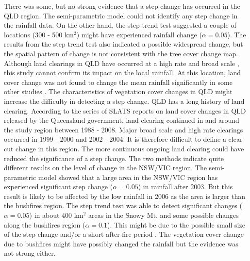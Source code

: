 \documentclass[draft,linenumbers]{agujournal}
\begin{document}
\begin{article}
There was some, but no strong evidence that a step change has occurred in the QLD region. The semi-parametric model could not identify any step change in the rainfall data. On the other hand, the step trend test suggested a couple of locations (300 - 500 km$^2$) might have experienced rainfall change ($\alpha = 0.05$). The results from the step trend test also indicated a possible widespread change, but the spatial pattern of change is not consistent with the tree cover change map. Although land clearings in QLD have occurred at a high rate and broad scale \citep{SLATS2005}, this study cannot confirm its impact on the local rainfall. At this location, land cover change was not found to change the mean rainfall significantly in some other studies \citep[e.g.][]{Narisma2003,McAlpine2007}. The characteristics of vegetation cover changes in QLD might increase the difficulty in detecting a step change. QLD has a long history of land clearing. According to the series of SLATS reports on land cover changes in QLD released by the Queensland government, land clearing continued in and around the study region between 1988 - 2008. Major broad scale and high rate clearings occurred in 1999 - 2000 and 2002 - 2004. It is therefore difficult to define a clear cut change in this region. The more continuous ongoing land clearing could have reduced the significance of a step change. %
The two methods indicate quite different results on the level of change in the NSW/VIC region. The semi-parametric model showed that a large area in the NSW/VIC region has experienced significant step change ($\alpha = 0.05$) in rainfall after 2003. But this result is likely to be affected by the low rainfall in 2006 as the area is larger than the bushfires region. The step trend test was able to detect significant changes ($\alpha = 0.05$) in about 400 km$^2$ areas in the Snowy Mt. and some possible changes along the bushfires region ($\alpha = 0.1$). This might be due to the possible small size of the step change and/or a short after-fire period \citep{Hirsch1985}. The vegetation cover change due to bushfires might have possibly changed the rainfall but the evidence was not strong either. 



\end{article}
\end{document}

